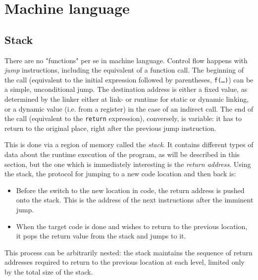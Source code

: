 \section{Machine language}
\label{sec:arch:asm}

\subsection{Stack}

There are no "functions" per se in machine language\footnotemark.  Control flow
happens with \textit{jump} instructions, including the equivalent of a function
call.  The beginning of the call (equivalent to the initial expression followed
by parentheses, \texttt{f(…)}) can be a simple, unconditional jump.  The
destination address is either a fixed value, as determined by the linker either
at link- or runtime for static or dynamic linking, or a dynamic value (i.e. from
a register) in the case of an indirect call.  The end of the call (equivalent to
the \texttt{return} expression), conversely, is variable: it has to return to
the original place, right after the previous jump instruction.


This is done via a region of memory called the \textit{stack}.  It contains
different types of data about the runtime execution of the program, as will be
described in this section, but the one which is immediately interesting is the
\textit{return address}.  Using the stack, the protocol for jumping to a new
code location and then back is:

\begin{itemize}
    \item
        Before the switch to the new location in code, the return address is
        pushed onto the stack.  This is the address of the next instructions
        after the imminent jump.
    \item
        When the target code is done and wishes to return to the previous
        location, it pops the return value from the stack and jumps to it.
\end{itemize}

This process can be arbitrarily nested: the stack maintains the sequence of
return addresses required to return to the previous location at each level,
limited only by the total size of the stack\footnotemark.


